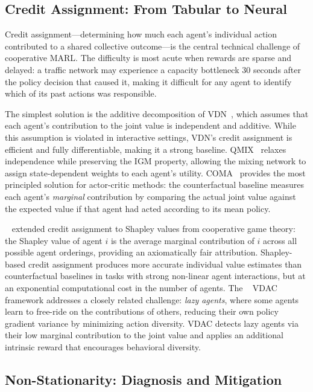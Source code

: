 \documentclass[12pt, a4paper]{article}
\begin{document}
\subsection{Credit Assignment: From Tabular to Neural}

Credit assignment---determining how much each agent's individual action
contributed to a shared collective outcome---is the central technical challenge
of cooperative MARL.  The difficulty is most acute when rewards are sparse
and delayed: a traffic network may experience a capacity bottleneck 30 seconds
after the policy decision that caused it, making it difficult for any agent
to identify which of its past actions was responsible.

The simplest solution is the additive decomposition of VDN~\cite{sunehag2018value},
which assumes that each agent's contribution to the joint value is independent
and additive.  While this assumption is violated in interactive settings,
VDN's credit assignment is efficient and fully differentiable, making it a
strong baseline.  QMIX~\cite{rashid2018qmix} relaxes independence while
preserving the IGM property, allowing the mixing network to assign
state-dependent weights to each agent's utility.  COMA~\cite{foerster2018counterfactual}
provides the most principled solution for actor-critic methods: the
counterfactual baseline measures each agent's \emph{marginal} contribution
by comparing the actual joint value against the expected value if that agent
had acted according to its mean policy.

\citeauthor{wang2020shapley}~\cite{wang2020shapley} extended credit assignment
to Shapley values from cooperative game theory: the Shapley value of agent $i$
is the average marginal contribution of $i$ across all possible agent orderings,
providing an axiomatically fair attribution.  Shapley-based credit assignment
produces more accurate individual value estimates than counterfactual baselines
in tasks with strong non-linear agent interactions, but at an exponential
computational cost in the number of agents.  The \citeauthor{su2021vdac}~\cite{su2021vdac}
VDAC framework addresses a closely related challenge: \emph{lazy agents},
where some agents learn to free-ride on the contributions of others, reducing
their own policy gradient variance by minimizing action diversity.  VDAC
detects lazy agents via their low marginal contribution to the joint value
and applies an additional intrinsic reward that encourages behavioral
diversity.

\subsection{Non-Stationarity: Diagnosis and Mitigation}
\end{document}
